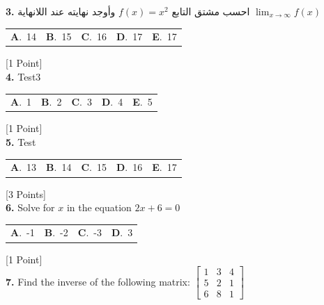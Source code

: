 \documentclass[12pt]{article}
\newcommand{\choice}[2]{\textbf{#1}.~#2}
\begin{document}
\noindent \textbf{\textenglish{3.}} {\textarabic{احسب مشتق التابع }}\( f(x) = x^2\){\textarabic{ وأوجد نهايته عند اللانهاية }}\(\lim_{x \to \infty}f(x)\)

\begin{tabularx}{\linewidth}{@{}*{5}{Y}@{}}
\choice{A}{{{\textenglish{14}}}} & \choice{B}{{{\textenglish{15}}}} & \choice{C}{{{\textenglish{16}}}} & \choice{D}{{{\textenglish{17}}}} & \choice{E}{{{\textenglish{17}}}} \\
\end{tabularx}
\hfill {\textenglish{[1 Point]}}\\[0.5em]

\noindent \textbf{\textenglish{4.}} {\textenglish{Test3}}

\begin{tabularx}{\linewidth}{@{}*{5}{Y}@{}}
\choice{A}{{{\textenglish{1}}}} & \choice{B}{{{\textenglish{2}}}} & \choice{C}{{{\textenglish{3}}}} & \choice{D}{{{\textenglish{4}}}} & \choice{E}{{{\textenglish{5}}}} \\
\end{tabularx}
\hfill {\textenglish{[1 Point]}}\\[0.5em]

\noindent \textbf{\textenglish{5.}} {\textenglish{Test}}

\begin{tabularx}{\linewidth}{@{}*{5}{Y}@{}}
\choice{A}{{{\textenglish{13}}}} & \choice{B}{{{\textenglish{14}}}} & \choice{C}{{{\textenglish{15}}}} & \choice{D}{{{\textenglish{16}}}} & \choice{E}{{{\textenglish{17}}}} \\
\end{tabularx}
\hfill {\textenglish{[3 Points]}}\\[0.5em]

\noindent \textbf{\textenglish{6.}} {\textenglish{Solve for }}\(x \){\textenglish{ in the equation }}\(2x+6 = 0 \)

\begin{tabularx}{\linewidth}{@{}*{4}{Y}@{}}
\choice{A}{{{\textenglish{-1}}}} & \choice{B}{{{\textenglish{-2}}}} & \choice{C}{{{\textenglish{-3}}}} & \choice{D}{{{\textenglish{3}}}} \\
\end{tabularx}
\hfill {\textenglish{[1 Point]}}\\[0.5em]

\noindent \textbf{\textenglish{7.}} {\textenglish{Find the inverse of the following matrix: }}\(\begin{bmatrix} 1 & 3 & 4 \\ 5 & 2 & 1 \\ 6 & 8 & 1 \end{bmatrix}\)
\end{document}
